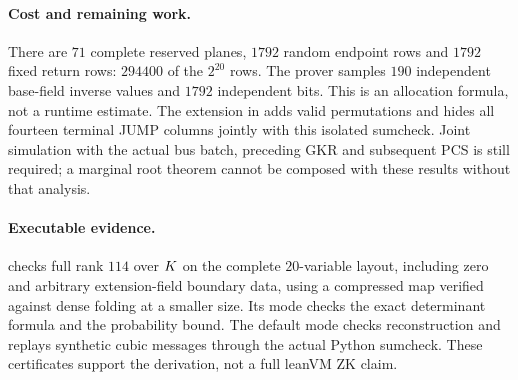 \paragraph{Cost and remaining work.} There are $71$ complete reserved planes, $1792$ random endpoint rows and $1792$ fixed return rows: $294400$ of the $2^{20}$ rows. The prover samples $190$ independent base-field inverse values and $1792$ independent bits. This is an allocation formula, not a runtime estimate. The extension in  adds valid permutations and hides all fourteen terminal JUMP columns jointly with this isolated sumcheck. Joint simulation with the actual bus batch, preceding GKR and subsequent PCS is still required; a marginal root theorem cannot be composed with these results without that analysis.

\paragraph{Executable evidence.}  checks full rank $114$ over $K$ on the complete $20$-variable layout, including zero and arbitrary extension-field boundary data, using a compressed map verified against dense folding at a smaller size. Its  mode checks the exact determinant formula and the probability bound. The default mode checks reconstruction and replays synthetic cubic messages through the actual Python sumcheck. These certificates support the derivation, not a full leanVM ZK claim.
